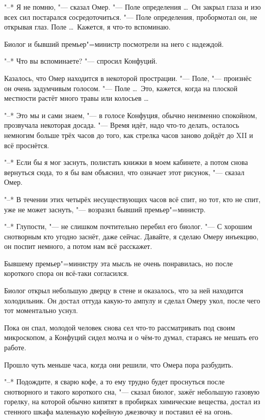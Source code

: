"--* Я не помню, "--- сказал Омер.
"--- Поле определения \ldots\
Он закрыл глаза и изо всех сил постарался сосредоточиться.
"--- Поле определения, пробормотал он, не открывая глаз.
Поле \ldots\
Кажется, я что-то вспоминаю.

Биолог и бывший премьер"=министр посмотрели на него с надеждой.

"--* Что вы вспоминаете? "--- спросил Конфуций.

Казалось, что Омер находится в некоторой прострации.
"--- Поле, "--- произнёс он очень задумчивым голосом.
"--- Поле \ldots\
Это, кажется, когда на плоской местности растёт много травы или колосьев \ldots

"--* Это мы и сами знаем, "--- в голосе Конфуция, обычно неизменно спокойном,
прозвучала некоторая досада.
"--- Время идёт, надо что-то делать, осталось немногим больше трёх часов до того,
как стрелка часов заново дойдёт до XII и всё проснётся.

"--* Если бы я мог заснуть, полистать книжки в моем кабинете, а потом снова
вернуться сюда, то я бы вам объяснил, что означает этот рисунок, "--- сказал
Омер.

"--* В течении этих четырёх несуществующих часов всё спит, но тот, кто не спит,
уже не может заснуть, "--- возразил бывший премьер"=министр.

"--* Глупости, "--- не слишком почтительно перебил его биолог.
"--- С хорошим снотворным кто угодно заснёт, даже сейчас.
Давайте, я сделаю Омеру инъекцию, он поспит немного, а потом нам всё расскажет.

Бывшему премьер"=министру эта мысль не очень понравилась, но после короткого
спора он всё-таки согласился.

Биолог открыл небольшую дверцу в стене и оказалось, что за ней находится
холодильник.
Он достал оттуда какую-то ампулу и сделал Омеру укол, после чего тот моментально
уснул.

Пока он спал, молодой человек снова сел что-то рассматривать под своим
микроскопом, а Конфуций сидел молча и о чём-то думал, стараясь не мешать его
работе.

Прошло чуть меньше часа, когда они решили, что Омера пора разбудить.

"--* Подождите, я сварю кофе, а то ему трудно будет проснуться после
снотворного и такого короткого сна, "--- сказал биолог, зажёг небольшую
газовую горелку, на которой обычно кипятят в пробирках химические вещества,
достал из стенного шкафа маленькую кофейную джезвочку и поставил её на огонь.


